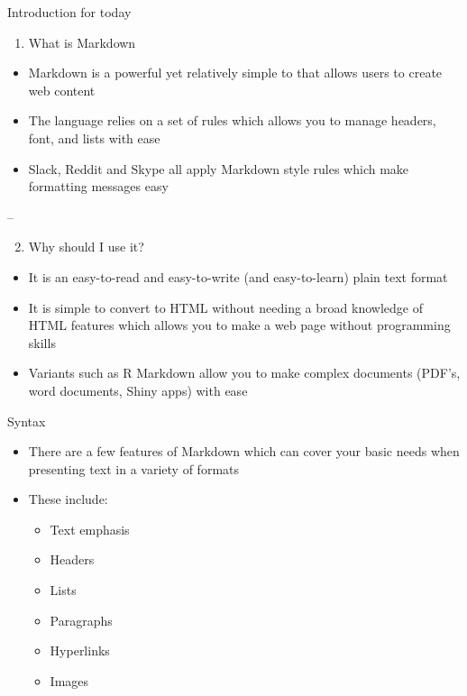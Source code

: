 \documentclass[
  ignorenonframetext,
]{beamer}
\providecommand{\tightlist}{%
  \setlength{\itemsep}{0pt}\setlength{\parskip}{0pt}}
\begin{document}
\begin{frame}{Introduction for today}
\protect\hypertarget{introduction-for-today}{}

\begin{enumerate}
\tightlist
\item
  What is Markdown
\end{enumerate}

\begin{itemize}
\item
  Markdown is a powerful yet relatively simple to that allows users to
  create web content
\item
  The language relies on a set of rules which allows you to manage
  headers, font, and lists with ease
\item
  Slack, Reddit and Skype all apply Markdown style rules which make
  formatting messages easy
\end{itemize}

--

\begin{enumerate}
\setcounter{enumi}{1}
\tightlist
\item
  Why should I use it?
\end{enumerate}

\begin{itemize}
\item
  It is an easy-to-read and easy-to-write (and easy-to-learn) plain text
  format
\item
  It is simple to convert to HTML without needing a broad knowledge of
  HTML features which allows you to make a web page without programming
  skills
\item
  Variants such as R Markdown allow you to make complex documents
  (PDF's, word documents, Shiny apps) with ease
\end{itemize}

\end{frame}

\begin{frame}{Syntax}
\protect\hypertarget{syntax}{}

\begin{itemize}
\item
  There are a few features of Markdown which can cover your basic needs
  when presenting text in a variety of formats
\item
  These include:

  \begin{itemize}
  \item
    Text emphasis
  \item
    Headers
  \item
    Lists
  \item
    Paragraphs
  \item
    Hyperlinks
  \item
    Images
  \end{itemize}
\end{itemize}

\end{frame}
\end{document}
